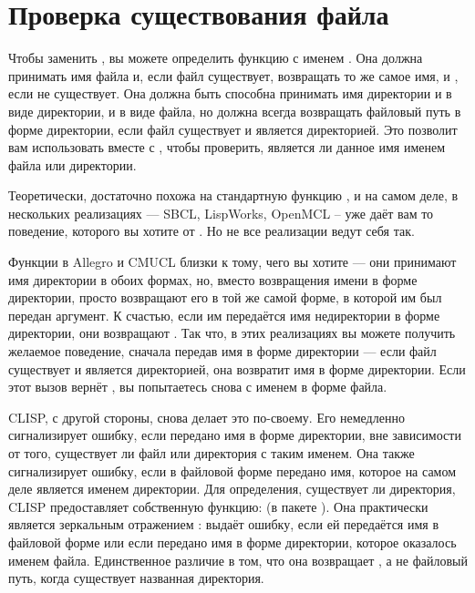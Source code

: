 \section{Проверка существования файла}

Чтобы заменить , вы можете определить функцию с именем
. Она должна принимать имя файла и, если файл существует, возвращать
то же самое имя, и , если не существует. Она должна быть способна принимать имя
директории и в виде директории, и в виде файла, но должна всегда возвращать файловый путь
в форме директории, если файл существует и является директорией. Это позволит вам
использовать  вместе с , чтобы проверить,
является ли данное имя именем файла или директории.

Теоретически,  достаточно похожа на стандартную функцию
, и на самом деле, в нескольких реализациях --- SBCL, LispWorks, OpenMCL
–  уже даёт вам то поведение, которого вы хотите от
. Но не все реализации  ведут себя так.

Функции  в Allegro и CMUCL близки к тому, чего вы хотите --- они
принимают имя директории в обоих формах, но, вместо возвращения имени в форме директории,
просто возвращают его в той же самой форме, в которой им был передан аргумент. К счастью,
если им передаётся имя недиректории в форме директории, они возвращают . Так
что, в этих реализациях вы можете получить желаемое поведение, сначала передав
 имя в форме директории --- если файл существует и является директорией,
она возвратит имя в форме директории. Если этот вызов вернёт , вы попытаетесь
снова с именем в форме файла.

CLISP, с другой стороны, снова делает это по-своему. Его  немедленно
сигнализирует ошибку, если передано имя в форме директории, вне зависимости от того,
существует ли файл или директория с таким именем. Она также сигнализирует ошибку, если в
файловой форме передано имя, которое на самом деле является именем директории. Для
определения, существует ли директория, CLISP предоставляет собственную функцию:
 (в пакете ). Она практически является зеркальным
отражением : выдаёт ошибку, если ей передаётся имя в файловой форме или
если передано имя в форме директории, которое оказалось именем файла. Единственное
различие в том, что она возвращает , а не файловый путь, когда существует
названная директория.

